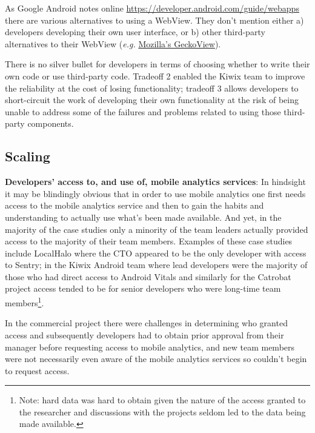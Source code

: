 As Google Android notes online \url{https://developer.android.com/guide/webapps} there are various alternatives to using a WebView. They don't mention either a) developers developing their own user interface, or b) other third-party alternatives to their WebView (\emph{e.g.} \href{https://mozilla.github.io/geckoview/}{Mozilla's GeckoView}). 

There is no silver bullet for developers in terms of choosing whether to write their own code or use third-party code. Tradeoff 2 enabled the Kiwix team to improve the reliability at the cost of losing functionality; tradeoff 3 allows developers to short-circuit the work of developing their own functionality at the risk of being unable to address some of the failures and problems related to using those third-party components.

\subsection{Scaling}
\textbf{Developers' access to, and use of, mobile analytics services}: 
In hindsight it may be blindingly obvious that in order to use mobile analytics one first needs access to the mobile analytics service and then to gain the habits and understanding to actually use what's been made available. And yet, in the majority of the case studies only a minority of the team leaders actually provided access to the majority of their team members. Examples of these case studies include LocalHalo where the CTO appeared to be the only developer with access to Sentry; in the Kiwix Android team where lead developers were the majority of those who had direct access to Android Vitals and similarly for the Catrobat project access tended to be for senior developers who were long-time team members\footnote{Note: hard data was hard to obtain given the nature of the access granted to the researcher and discussions with the projects seldom led to the data being made available.}.

In the commercial project there were challenges in determining who granted access and subsequently developers had to obtain prior approval from their manager before requesting access to mobile analytics, and new team members were not necessarily even aware of the mobile analytics services so couldn't begin to request access. 

